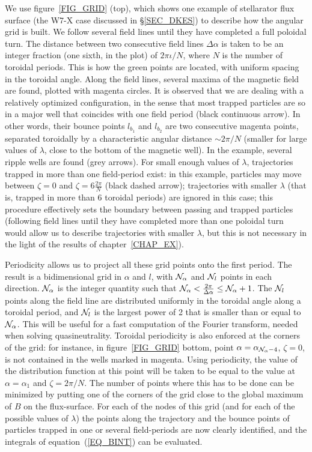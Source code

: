 We use figure~\ref{FIG_GRID} (top), which shows one example of stellarator flux surface (the W7-X case discussed in \S\ref{SEC_DKES}) to describe how the angular grid is built. We follow several field lines until they have completed a full poloidal turn. The distance between two consecutive field lines $\Delta\alpha$ is taken to be an integer fraction (one sixth, in the plot) of $2\pi\iota/N$, where $N$ is the number of toroidal periods. This is how the green points are located, with uniform spacing in the toroidal angle. Along the field lines, several maxima of the magnetic field are found, plotted with magenta circles. It is observed that we are dealing with a relatively optimized configuration, in the sense that most trapped particles are so in a major well that coincides with one field period (black continuous arrow). In other words, their bounce points $l_{b_1}$ and $l_{b_2}$ are two consecutive magenta points, separated toroidally by a characteristic angular distance $\sim 2\pi/N$ (smaller for large values of $\lambda$, close to the bottom of the magnetic well). In the example, several ripple wells are found (grey arrows). For small enough values of $\lambda$, trajectories trapped in more than one field-period exist: in this example, particles may move between $\zeta=0$ and $\zeta=6\frac{2\pi}{N}$ (black dashed arrow); trajectories with smaller $\lambda$ (that is, trapped in more than 6 toroidal periods) are ignored in this case; this procedure effectively sets the boundary between passing and trapped particles (following field lines until they have completed more than one poloidal turn would allow us to describe trajectories with smaller $\lambda$,  but this is not necessary in the light of the results of chapter~\ref{CHAP_EX}).

Periodicity allows us to project all these grid points onto the first period. The result is a bidimensional grid in $\alpha$ and $l$, with ${\cal{N}}_\alpha$ and ${\cal{N}}_l$ points in each direction. ${\cal{N}}_\alpha$ is the integer quantity such that ${\cal{N}}_\alpha<\frac{2\pi}{\Delta\alpha}\le{\cal{N}}_\alpha+1$. The ${\cal{N}}_l$ points along the field line are distributed uniformly in the toroidal angle along a toroidal period, and ${\cal{N}}_l$ is the largest power of 2 that is smaller than or equal to ${\cal{N}}_\alpha$. This will be useful for a fast computation of the Fourier transform, needed when solving quasineutrality. Toroidal periodicity is also enforced at the corners of the grid: for instance, in figure~\ref{FIG_GRID} bottom, point $\alpha=\alpha_{{\cal{N}}_\alpha-4}$, $\zeta=0$, is not contained in the wells marked in magenta. Using periodicity, the value of the distribution function at  this point will be taken to be equal to the value at $\alpha=\alpha_1$ and $\zeta=2\pi/N$. The number of points where this has to be done can be minimized by putting one of the corners of the grid close to the global maximum of $B$ on the flux-surface. For each of the nodes of this grid (and for each of the possible values of $\lambda$) the points along the trajectory and the bounce points of particles trapped in one or several field-periods are now clearly identified, and the integrals of equation~(\ref{EQ_BINT}) can be evaluated. 

